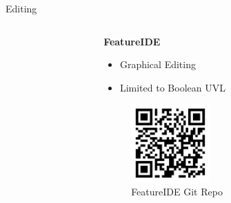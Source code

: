 \documentclass[
	aspectratio=169, %
	8pt, %
	nosectionframes, %
]{beamer}
\newcommand{\inlinesubtitle}[1]{\textcolor{gray!60}{~{}~#1}}
\begin{document}
\begin{frame}{\insertsection \inlinesubtitle{Editing}}
\begin{columns}[t]
\begin{column}{0.3\textwidth}
		\end{column}
  		\begin{column}{0.3\textwidth}
            \textbf{FeatureIDE}
			\begin{itemize}
                    \item Graphical Editing
                    \item Limited to Boolean UVL
			\end{itemize}
   			            \begin{figure}
                \centering
                \includegraphics[width=3cm]{pics/qr/featureide.pdf}
                \caption{FeatureIDE Git Repo}
            \end{figure}

		\end{column}
	\end{columns}
\end{frame}
\end{document}

